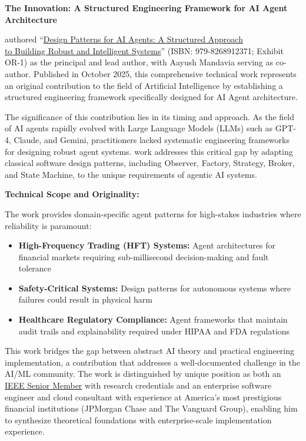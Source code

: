 \textbf{The Innovation: A Structured Engineering Framework for AI Agent Architecture}

\dr authored ``\underline{Design Patterns for AI Agents: A Structured Approach}\\ \underline{to Building Robust and Intelligent Systems}'' (ISBN: 979-8268912371; Exhibit OR-1) as the principal and lead author, with Aayush Mandavia serving as co-author. Published in October 2025, this comprehensive technical work represents an original contribution to the field of Artificial Intelligence by establishing a structured engineering framework specifically designed for AI Agent architecture.

The significance of this contribution lies in its timing and approach. As the field of AI agents rapidly evolved with Large Language Models (LLMs) such as GPT-4, Claude, and Gemini, practitioners lacked systematic engineering frameworks for designing robust agent systems. \drs work addresses this critical gap by adapting classical software design patterns, including Observer, Factory, Strategy, Broker, and State Machine, to the unique requirements of agentic AI systems.

\textbf{Technical Scope and Originality:}

The work provides domain-specific agent patterns for high-stakes industries where reliability is paramount:

\begin{itemize}
    \item \textbf{High-Frequency Trading (HFT) Systems:} Agent architectures for financial markets requiring sub-millisecond decision-making and fault tolerance
    \item \textbf{Safety-Critical Systems:} Design patterns for autonomous systems where failures could result in physical harm
    \item \textbf{Healthcare Regulatory Compliance:} Agent frameworks that maintain audit trails and explainability required under HIPAA and FDA regulations
\end{itemize}

This work bridges the gap between abstract AI theory and practical engineering implementation, a contribution that addresses a well-documented challenge in the AI/ML community. The work is distinguished by \drs unique position as both an \underline{IEEE Senior Member} with research credentials and an enterprise software engineer and cloud consultant with experience at America's most prestigious financial institutions (JPMorgan Chase and The Vanguard Group), enabling him to synthesize theoretical foundations with enterprise-scale implementation experience.

